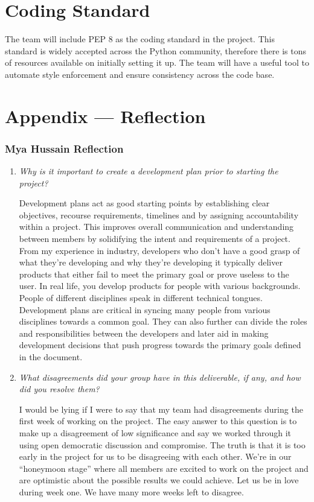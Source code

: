 \documentclass{article}
\begin{document}
\section{Coding Standard}

The team will include PEP 8 as the coding standard in the project.
This standard is widely accepted across the Python community,
therefore there is tons of resources available on initially setting
it up. The team will have a useful tool to automate style enforcement
and ensure consistency across the code base.

\newpage{}

\section*{Appendix --- Reflection}

\subsubsection*{Mya Hussain Reflection}

\begin{enumerate}
  \item \textit{Why is it important to create a development plan
    prior to starting the project?}

    Development plans act as good starting points by establishing
    clear objectives, recourse requirements, timelines and by
    assigning accountability within a project. This improves overall
    communication and understanding between members by solidifying
    the intent and requirements of a project. From my experience in
    industry, developers who don’t have a good grasp of what they’re
    developing and why they’re developing it typically deliver
    products that either fail to meet the primary goal or prove useless to
    the user. In real life, you develop products for people with
    various backgrounds. People of different disciplines speak in different
    technical tongues. Development plans are critical in syncing many
    people from various disciplines towards a common goal. They can also
    further can divide the roles and responsibilities between the
    developers and later aid in making development decisions that push
    progress towards the primary goals defined in the document.

  \item \textit{What disagreements did your group have in this
    deliverable, if any, and how did you resolve them?}

    I would be lying if I were to say that my team had disagreements
    during the first week of working on the project. The easy answer to
    this question is to make up a disagreement of low significance
    and say we worked through it using open democratic discussion and
    compromise. The truth is that it is too early in the project for
    us to be disagreeing with each other. We’re in our “honeymoon stage”
    where all members are excited to work on the project and are
    optimistic about the possible results we could achieve. Let us be in love
    during week one. We have many more weeks left to disagree.

\end{enumerate}
\end{document}
